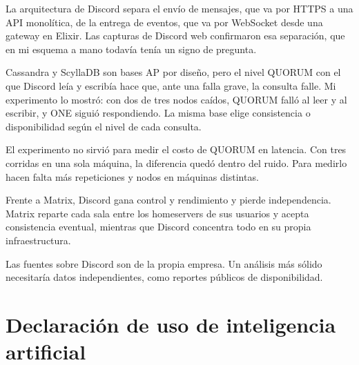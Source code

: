 \documentclass[11pt,a4paper]{article}
\begin{document}
La arquitectura de Discord separa el envío de mensajes, que va por HTTPS a una API monolítica, de la entrega de eventos, que va por WebSocket desde una gateway en Elixir. Las capturas de Discord web confirmaron esa separación, que en mi esquema a mano todavía tenía un signo de pregunta.

Cassandra y ScyllaDB son bases AP por diseño, pero el nivel QUORUM con el que Discord leía y escribía hace que, ante una falla grave, la consulta falle. Mi experimento lo mostró: con dos de tres nodos caídos, QUORUM falló al leer y al escribir, y ONE siguió respondiendo. La misma base elige consistencia o disponibilidad según el nivel de cada consulta.

El experimento no sirvió para medir el costo de QUORUM en latencia. Con tres corridas en una sola máquina, la diferencia quedó dentro del ruido. Para medirlo hacen falta más repeticiones y nodos en máquinas distintas.

Frente a Matrix, Discord gana control y rendimiento y pierde independencia. Matrix reparte cada sala entre los homeservers de sus usuarios y acepta consistencia eventual, mientras que Discord concentra todo en su propia infraestructura.

Las fuentes sobre Discord son de la propia empresa. Un análisis más sólido necesitaría datos independientes, como reportes públicos de disponibilidad.

\section{Declaración de uso de inteligencia artificial}
\end{document}
